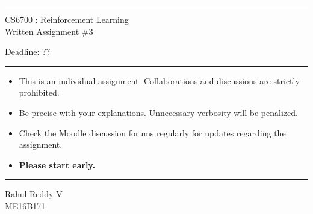 \documentclass[solution,addpoints,12pt]{exam}
\begin{document}
\hrule
\vspace{1mm}
\noindent 
\begin{center}
{\Large CS6700 : Reinforcement Learning} \\
{\large Written Assignment \#3}
\end{center}
\vspace{1mm}
\noindent 
{\large \hfill Deadline: ??}

\vspace{2mm}
\hrule

{\small

\begin{itemize}\itemsep0mm
\item This is an individual assignment. Collaborations and discussions are strictly
prohibited.
\item Be precise with your explanations. Unnecessary verbosity will be penalized.
\item Check the Moodle discussion forums regularly for updates regarding the assignment.
\item \textbf{Please start early.}
\end{itemize}
}

\hrule

\vspace{3mm}
 Rahul Reddy V \\[1mm]
 ME16B171   \\
\end{document}
